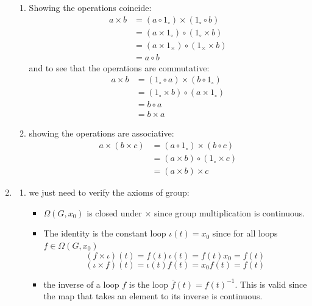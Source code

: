 \documentclass{article}
\begin{document}
\begin{homeworkProblem}
\begin{enumerate}
\begin{enumerate}[label=\roman*.]
            \item Showing the operations coincide:
            \begin{align*}
                a \times b &= (a \circ 1_\circ) \times (1_\circ \circ b) \\
                &= (a \times 1_\circ) \circ (1_\circ \times b) \\
                &= (a \times 1_\times) \circ (1_\times \times b) \\
                &= a \circ b
            \end{align*}
            and to see that the operations are commutative:
            \begin{align*}
                a \times b &= (1_\circ \circ a) \times (b \circ 1_\circ) \\
                &= (1_\circ \times b) \circ (a \times 1_\circ) \\
                &= b \circ a \\
                &= b \times a
            \end{align*}
            \item showing the operations are associative:
            \begin{align*}
                a \times (b \times c) &= (a \circ 1_\circ) \times (b \circ c) \\
                &= (a \times b) \circ (1_\circ \times c) \\
                &= (a \times b) \times c 
            \end{align*}
        \end{enumerate}
        \item
        \begin{enumerate}[label=\roman*.]
            \item we just need to verify the axioms of group:
            \begin{itemize}
                \item $\Omega(G, x_0)$ is closed under $\times$ since group multiplication is continuous.
                \item The identity is the constant loop $\iota(t)=x_0$ since for all loops $f\in\Omega(G, x_0)$
                \[(f\times\iota)(t) = f(t)\iota(t) = f(t)x_0 = f(t)\]
                \[(\iota\times f)(t) = \iota(t)f(t) = x_0f(t) = f(t)\]
                \item the inverse of a loop $f$ is the loop $\bar{f}(t) = f(t)^{-1}$. This is valid since the map that takes an element to its inverse is continuous.

\end{itemize}
\end{enumerate}
\end{enumerate}
\end{homeworkProblem}
\end{document}
